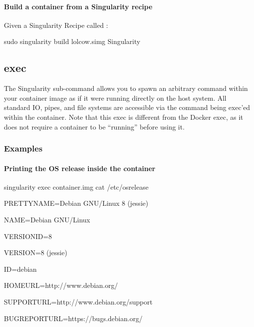 \documentclass[letterpaper,10pt,english]{sphinxmanual}
\begin{document}
\paragraph{Build a container from a Singularity recipe}
\label{\detokenize{appendix:build-a-container-from-a-singularity-recipe}}
Given a Singularity Recipe called  :

%
\begin{sphinxVerbatim}[commandchars=\\\{\}]
\PYGZdl{} sudo singularity build lolcow.simg Singularity
\end{sphinxVerbatim}


\subsection{exec}
\label{\detokenize{appendix:id27}}\label{\detokenize{appendix:sec-exec}}
The  Singularity sub-command allows you to spawn an arbitrary command
within your container image as if it were running directly on the host
system. All standard IO, pipes, and file systems are accessible via the
command being exec’ed within the container. Note that this exec is
different from the Docker exec, as it does not require a container to be
“running” before using it.


\subsubsection{Examples}
\label{\detokenize{appendix:id28}}

\paragraph{Printing the OS release inside the container}
\label{\detokenize{appendix:printing-the-os-release-inside-the-container}}
%
\begin{sphinxVerbatim}[commandchars=\\\{\}]
\PYGZdl{} singularity exec container.img cat /etc/os\PYGZhy{}release

PRETTY\PYGZus{}NAME=\PYGZdq{}Debian GNU/Linux 8 (jessie)\PYGZdq{}

NAME=\PYGZdq{}Debian GNU/Linux\PYGZdq{}

VERSION\PYGZus{}ID=\PYGZdq{}8\PYGZdq{}

VERSION=\PYGZdq{}8 (jessie)\PYGZdq{}

ID=debian

HOME\PYGZus{}URL=\PYGZdq{}http://www.debian.org/\PYGZdq{}

SUPPORT\PYGZus{}URL=\PYGZdq{}http://www.debian.org/support\PYGZdq{}

BUG\PYGZus{}REPORT\PYGZus{}URL=\PYGZdq{}https://bugs.debian.org/\PYGZdq{}

\PYGZdl{}
\end{sphinxVerbatim}
\end{document}
